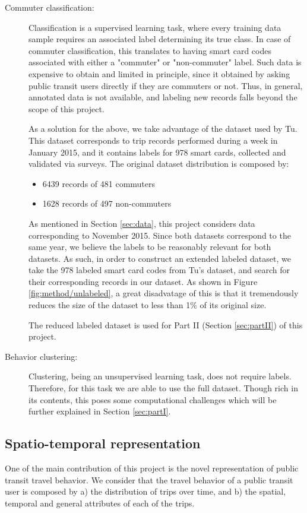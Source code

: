 \documentclass{article}
\begin{document}
\begin{description}%
\item[Commuter classification:]
Classification is a supervised learning task, where every training data sample requires an associated label determining its true class. In case of commuter classification, this translates to having smart card codes associated with either a "commuter" or "non-commuter" label. Such data is expensive to obtain and limited in principle, since it obtained by asking public transit users directly if they are commuters or not. Thus, in general, annotated data is not available, and labeling new records falls beyond the scope of this project. 

As a solution for the above, we take advantage of the dataset used by Tu\cite{tu2016impact}. This dataset corresponds to trip records performed during a week in January 2015, and it contains labels for 978 smart cards, collected and validated via surveys. The original dataset distribution is composed by:

\begin{itemize}
\item 6439 records of 481 commuters
\item 1628 records of 497 non-commuters
\end{itemize}

As mentioned in Section \ref{sec:data}, this project considers data corresponding to November 2015. Since both datasets correspond to the same year, we believe the labels to be reasonably relevant for both datasets. As such, in order to construct an extended labeled dataset, we take the 978 labeled smart card codes from Tu's dataset, and search for their corresponding records in our dataset. As shown in Figure \ref{fig:method/unlabeled}, a great disadvatage of this is that it tremendously reduces the size of the dataset to less than 1\% of its original size. 

The reduced labeled dataset is used for Part II (Section \ref{sec:partII}) of this project. 

\item[Behavior clustering:]
Clustering, being an unsupervised learning task, does not require labels. Therefore, for this task we are able to use the full dataset. Though rich in its contents, this poses some computational challenges which will be further explained in Section \ref{sec:partI}. 
\end{description}

\subsection{Spatio-temporal representation}
\label{sec:structure}
One of the main contribution of this project is the novel representation of public transit travel behavior. We consider that the travel behavior of a public transit user is composed by a) the distribution of trips over time, and b) the spatial, temporal and general attributes of each of the trips. 
\end{document}
